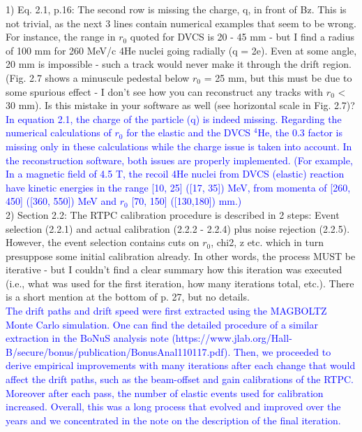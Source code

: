 1) Eq. 2.1, p.16: The second row is missing the charge, q, in front of Bz. This 
is not trivial, as the next 3 lines contain numerical examples that seem to be 
wrong. For instance, the range in $r_{0}$ quoted for DVCS is 20 - 45 mm - but I 
find a radius of 100 mm for 260 MeV/c 4He nuclei going radially (q = 2e). Even 
at some angle, 20 mm is impossible - such a track would never make it through 
the drift region. (Fig. 2.7 shows a minuscule pedestal below $r_{0}$ = 25 mm, but 
this must be due to some spurious effect - I don't see how you can reconstruct 
any tracks with $r_{0}$ < 30 mm). Is this mistake in your software as well (see 
horizontal scale in Fig. 2.7)?\\
\textcolor{blue}{
   In equation 2.1, the charge of the particle (q) is indeed missing. Regarding the 
numerical calculations of $r_0$ for the elastic and the DVCS $^4$He, the 0.3 
factor is missing only in these calculations while the charge issue is taken 
into account. In the reconstruction software, both issues are properly 
implemented. (For example, In a magnetic field of 4.5 T, the recoil 4He nuclei 
from DVCS (elastic) reaction have kinetic energies in the range [10, 25] ([17, 
35]) MeV, from momenta of [260, 450] ([360, 550]) MeV and $r_0$ [70, 150] 
([130,180]) mm.) }\\

2) Section 2.2: The RTPC calibration procedure is described in 2 steps: Event 
selection (2.2.1) and actual calibration (2.2.2 - 2.2.4) plus noise rejection 
(2.2.5). However, the event selection contains cuts on $r_0$, chi2, z etc.  
which in turn presuppose some initial calibration already. In other words, the 
process MUST be iterative - but I couldn't find a clear summary how this 
iteration was executed (i.e., what was used for the first iteration, how many 
iterations total, etc.). There is a short mention at the bottom of p. 27, but 
no details.\\
\textcolor{blue}{The drift paths and drift speed were first extracted using the 
MAGBOLTZ Monte Carlo simulation. One can find the detailed procedure of 
a similar extraction in the BoNuS analysis note 
(https://www.jlab.org/Hall-B/secure/bonus/publication/BonusAnal110117.pdf).  
Then, we proceeded to derive empirical improvements with many iterations after 
each change that would affect the drift paths, such as the beam-offset
 and gain calibrations of the RTPC. Moreover after each pass, the number of
elastic events used for calibration increased. Overall, this was a long 
process that evolved and improved over the years and we concentrated in the 
note on the description of the final iteration.}\\

